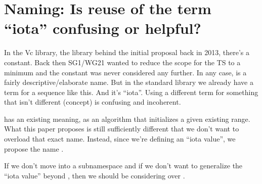 \section{Naming: Is reuse of the term “iota” confusing or helpful?}

In the Vc library, the library behind the initial proposal back in 2013,
there's a  constant.
Back then SG1/WG21 wanted to reduce the scope for the TS to a minimum and the
constant was never considered any further.
In any case,  is a fairly descriptive/elaborate name.
But in the standard library we already have a term for a sequence like this.
And it's “iota”.
Using a different term for something that isn't different (concept) is
confusing and incoherent.

 has an existing meaning, as an algorithm that initializes a
given existing range.
What this paper proposes is still sufficiently different that we don't want to
overload that exact name.
Instead, since we're defining an “iota value”, we propose the name .

If we don't move  into a \std{} subnamespace and if we
don't want to generalize the “iota value” beyond , then we should be
considering  over .

